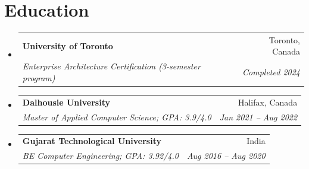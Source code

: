 \documentclass[letterpaper,9.5pt]{article}
\makeatletter
\newcommand{\resumeSubheading}[4]{\vspace{-2pt}\item\begin{tabular*}{0.97\textwidth}{l@{\extracolsep{\fill}}r}\textbf{#1} & #2 \\\textit{\small#3} & \textit{\small #4} \\\end{tabular*}\vspace{-6pt}}
\newcommand{\resumeSubHeadingListStart}{\begin{itemize}[leftmargin=*]}
\newcommand{\resumeSubHeadingListEnd}{\end{itemize}}
\makeatother
\begin{document}
\section{Education}
\resumeSubHeadingListStart
  \resumeSubheading
    {University of Toronto}{Toronto, Canada}
    {Enterprise Architecture Certification (3-semester program)}{Completed 2024}
  \resumeSubheading
    {Dalhousie University}{Halifax, Canada}
    {Master of Applied Computer Science; GPA: 3.9/4.0}{Jan 2021 -- Aug 2022}
  \resumeSubheading
    {Gujarat Technological University}{India}
    {BE Computer Engineering; GPA: 3.92/4.0}{Aug 2016 -- Aug 2020}
\resumeSubHeadingListEnd
\end{document}
